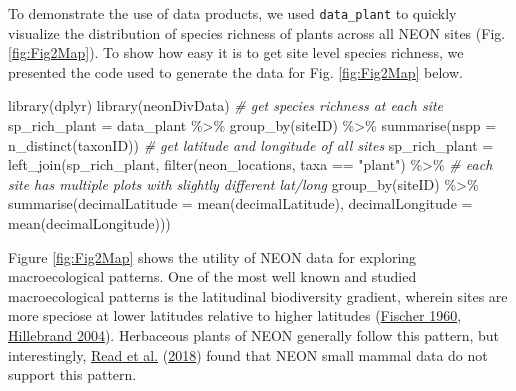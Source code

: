 \documentclass[
  12pt,
]{article}
\newenvironment{Shaded}{\begin{snugshade}}{\end{snugshade}}
\newcommand{\AttributeTok}[1]{\textcolor[rgb]{0.77,0.63,0.00}{#1}}
\newcommand{\CommentTok}[1]{\textcolor[rgb]{0.56,0.35,0.01}{\textit{#1}}}
\newcommand{\FunctionTok}[1]{\textcolor[rgb]{0.00,0.00,0.00}{#1}}
\newcommand{\NormalTok}[1]{#1}
\newcommand{\OtherTok}[1]{\textcolor[rgb]{0.56,0.35,0.01}{#1}}
\newcommand{\SpecialCharTok}[1]{\textcolor[rgb]{0.00,0.00,0.00}{#1}}
\newcommand{\StringTok}[1]{\textcolor[rgb]{0.31,0.60,0.02}{#1}}
\begin{document}
To demonstrate the use of data products, we used \texttt{data\_plant} to quickly visualize the distribution of species richness of plants across all NEON sites (Fig. \ref{fig:Fig2Map}). To show how easy it is to get site level species richness, we presented the code used to generate the data for Fig. \ref{fig:Fig2Map} below.

\begin{Shaded}
\begin{Highlighting}[]
\FunctionTok{library}\NormalTok{(dplyr)}
\FunctionTok{library}\NormalTok{(neonDivData)}
\CommentTok{\# get species richness at each site}
\NormalTok{sp\_rich\_plant }\OtherTok{=}\NormalTok{ data\_plant }\SpecialCharTok{\%\textgreater{}\%}
  \FunctionTok{group\_by}\NormalTok{(siteID) }\SpecialCharTok{\%\textgreater{}\%}
  \FunctionTok{summarise}\NormalTok{(}\AttributeTok{nspp =} \FunctionTok{n\_distinct}\NormalTok{(taxonID))}
\CommentTok{\# get latitude and longitude of all sites}
\NormalTok{sp\_rich\_plant }\OtherTok{=} \FunctionTok{left\_join}\NormalTok{(sp\_rich\_plant,}
                          \FunctionTok{filter}\NormalTok{(neon\_locations, taxa }\SpecialCharTok{==} \StringTok{"plant"}\NormalTok{) }\SpecialCharTok{\%\textgreater{}\%}
                            \CommentTok{\# each site has multiple plots with slightly different lat/long}
                            \FunctionTok{group\_by}\NormalTok{(siteID) }\SpecialCharTok{\%\textgreater{}\%}
                            \FunctionTok{summarise}\NormalTok{(}\AttributeTok{decimalLatitude =} \FunctionTok{mean}\NormalTok{(decimalLatitude),}
                                      \AttributeTok{decimalLongitude =} \FunctionTok{mean}\NormalTok{(decimalLongitude)))}
\end{Highlighting}
\end{Shaded}

Figure \ref{fig:Fig2Map} shows the utility of NEON data for exploring macroecological patterns. One of the most well known and studied macroecological patterns is the latitudinal biodiversity gradient, wherein sites are more speciose at lower latitudes relative to higher latitudes (\protect\hyperlink{ref-fischer1960latitudinal}{Fischer 1960}, \protect\hyperlink{ref-hillebrand2004generality}{Hillebrand 2004}). Herbaceous plants of NEON generally follow this pattern, but interestingly, \protect\hyperlink{ref-read2018among}{Read et al.} (\protect\hyperlink{ref-read2018among}{2018}) found that NEON small mammal data do not support this pattern.
\end{document}
